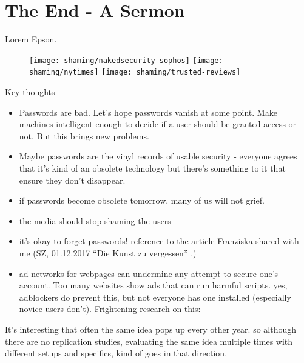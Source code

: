 
\chapter[The End - A Sermon]{The End - A Sermon}\label{chap:the_end}


Lorem Epson. 

\begin{figure}[htpb]
	\centering
	\texttt{[image: shaming/nakedsecurity-sophos]}
	\texttt{[image: shaming/nytimes]}
	\texttt{[image: shaming/trusted-reviews]}
\end{figure}

Key thoughts

\begin{itemize}
\item Passwords are bad. Let's hope passwords vanish at some point. Make machines intelligent enough to decide if a user should be granted access or not. But this brings new problems.
\item Maybe passwords are the vinyl records of usable security - everyone agrees that it's kind of an obsolete technology but there's something to it that ensure they don't disappear. %
 \item  if passwords become obsolete tomorrow, many of us will not grief. 
 \item  the media should stop shaming the users 
 \item  it's okay to forget passwords! reference to the article Franziska shared with me (SZ,  01.12.2017 ``Die Kunst zu vergessen'' .)
 \item 	ad networks for webpages can undermine any attempt to secure one's account. Too many websites show ads that can run harmful scripts. yes, adblockers do prevent this, but not everyone has one installed (especially novice users don't). Frightening research on this: 
\end{itemize}

It's interesting that often the same idea pops up every other year. so although there are no replication studies, evaluating the same idea multiple times with different setups and specifics, kind of goes in that direction. 




